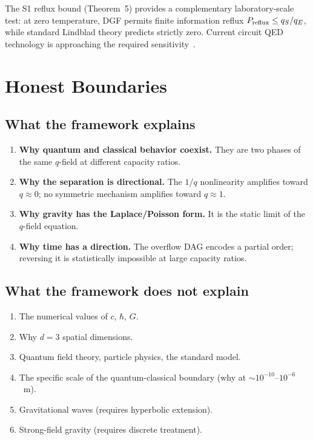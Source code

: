 \documentclass[reprint]{revtex4-2}
\begin{document}
The S1 reflux bound (Theorem~5) provides a complementary laboratory-scale test: at zero temperature, DGF permits finite information reflux $P_{\rm reflux}\le q_S/q_E$, while standard Lindblad theory predicts strictly zero. Current circuit QED technology is approaching the required sensitivity~\cite{circuit_qed_prediction}.

\section{Honest Boundaries}

\subsection{What the framework explains}

\begin{enumerate}
\item \textbf{Why quantum and classical behavior coexist.} They are two phases of the same $q$-field at different capacity ratios.
\item \textbf{Why the separation is directional.} The $1/q$ nonlinearity amplifies toward $q\approx 0$; no symmetric mechanism amplifies toward $q\approx 1$.
\item \textbf{Why gravity has the Laplace/Poisson form.} It is the static limit of the $q$-field equation.
\item \textbf{Why time has a direction.} The overflow DAG encodes a partial order; reversing it is statistically impossible at large capacity ratios.
\end{enumerate}

\subsection{What the framework does not explain}

\begin{enumerate}
\item The numerical values of $c$, $\hbar$, $G$.
\item Why $d=3$ spatial dimensions.
\item Quantum field theory, particle physics, the standard model.
\item The specific scale of the quantum-classical boundary (why at $\sim 10^{-10}$--$10^{-6}$~m).
\item Gravitational waves (requires hyperbolic extension).
\item Strong-field gravity (requires discrete treatment).
\end{enumerate}
\end{document}
